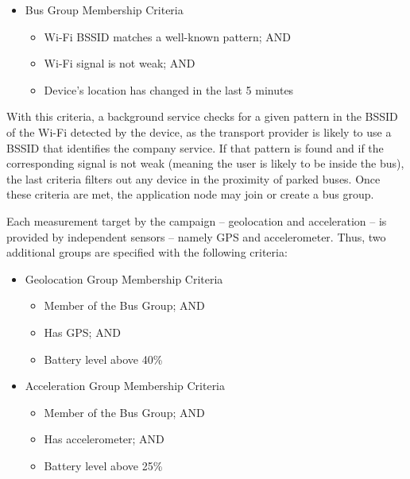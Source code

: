 \begin{itemize}

\item Bus Group Membership Criteria

\begin{itemize}

	\item Wi-Fi BSSID matches a well-known pattern; AND
	
	\item Wi-Fi signal is not weak; AND
	
	\item Device's location has changed in the last 5 minutes
	
\end{itemize}

\end{itemize}

With this criteria, a background service checks for a given pattern in the BSSID of the Wi-Fi detected by the device, as the transport provider is likely to use a BSSID that identifies the company service. If that pattern is found and if the corresponding signal is not weak (meaning the user is likely to be inside the bus), the last criteria filters out any device in the proximity of parked buses. Once these criteria are met, the application node may join or create a bus group.

Each measurement target by the campaign -- geolocation and acceleration -- is provided by independent sensors -- namely GPS and accelerometer. Thus, two additional groups are specified with the following criteria:

\begin{itemize}
	
	\item Geolocation Group Membership Criteria
	
	\begin{itemize}
		
		\item Member of the Bus Group; AND
		
		\item Has GPS; AND
		
		\item Battery level above 40\%
		
	\end{itemize}
	
	\item Acceleration Group Membership Criteria
	
	\begin{itemize}
		
		\item Member of the Bus Group; AND
		
		\item Has accelerometer; AND
		
		\item Battery level above 25\%
				
	\end{itemize}
	
\end{itemize}

